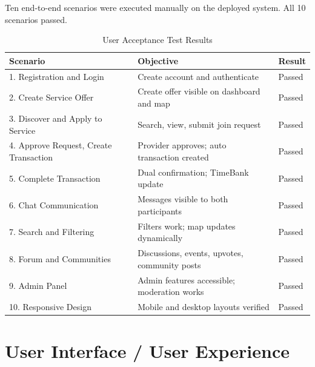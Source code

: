 \documentclass[11pt,a4paper]{report}
\begin{document}
Ten end-to-end scenarios were executed manually on the deployed system. All 10 scenarios passed.

\begin{table}[h]
    \centering
    \begin{tabularx}{\textwidth}{|l|l|X|}
        \hline
        \textbf{Scenario}                      & \textbf{Objective}                            & \textbf{Result} \\
        \hline
        1. Registration and Login              & Create account and authenticate               & Passed          \\
        \hline
        2. Create Service Offer                & Create offer visible on dashboard and map     & Passed          \\
        \hline
        3. Discover and Apply to Service       & Search, view, submit join request             & Passed          \\
        \hline
        4. Approve Request, Create Transaction & Provider approves; auto transaction created   & Passed          \\
        \hline
        5. Complete Transaction                & Dual confirmation; TimeBank update            & Passed          \\
        \hline
        6. Chat Communication                  & Messages visible to both participants         & Passed          \\
        \hline
        7. Search and Filtering                & Filters work; map updates dynamically         & Passed          \\
        \hline
        8. Forum and Communities               & Discussions, events, upvotes, community posts & Passed          \\
        \hline
        9. Admin Panel                         & Admin features accessible; moderation works   & Passed          \\
        \hline
        10. Responsive Design                  & Mobile and desktop layouts verified           & Passed          \\
        \hline
    \end{tabularx}
    \caption{User Acceptance Test Results}
\end{table}

\chapter{User Interface / User Experience}
\label{chap:uiux}
\end{document}
